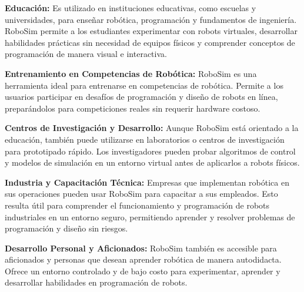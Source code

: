 \textbf{Educación:} Es utilizado en instituciones educativas, como escuelas y universidades, para enseñar robótica, programación y fundamentos de ingeniería. RoboSim permite a los estudiantes experimentar con robots virtuales, desarrollar habilidades prácticas sin necesidad de equipos físicos y comprender conceptos de programación de manera visual e interactiva.

\textbf{Entrenamiento en Competencias de Robótica:} RoboSim es una herramienta ideal para entrenarse en competencias de robótica. Permite a los usuarios participar en desafíos de programación y diseño de robots en línea, preparándolos para competiciones reales sin requerir hardware costoso.

\textbf{Centros de Investigación y Desarrollo:} Aunque RoboSim está orientado a la educación, también puede utilizarse en laboratorios o centros de investigación para prototipado rápido. Los investigadores pueden probar algoritmos de control y modelos de simulación en un entorno virtual antes de aplicarlos a robots físicos.

\textbf{Industria y Capacitación Técnica:} Empresas que implementan robótica en sus operaciones pueden usar RoboSim para capacitar a sus empleados. Esto resulta útil para comprender el funcionamiento y programación de robots industriales en un entorno seguro, permitiendo aprender y resolver problemas de programación y diseño sin riesgos.

\textbf{Desarrollo Personal y Aficionados:} RoboSim también es accesible para aficionados y personas que desean aprender robótica de manera autodidacta. Ofrece un entorno controlado y de bajo costo para experimentar, aprender y desarrollar habilidades en programación de robots.

